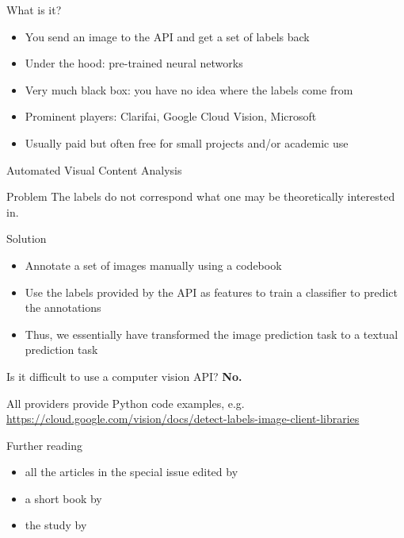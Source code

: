 \begin{frame}{What is it?}
  \begin{itemize}
  \item You send an image to the API and get a set of labels back
  \item Under the hood: pre-trained neural networks
  \item Very much black box: you have no idea where the labels come from
  \item Prominent players: Clarifai, Google Cloud Vision, Microsoft
  \item Usually paid but often free for small projects and/or academic use
  \end{itemize}

\end{frame}


\begin{frame}{Automated Visual Content Analysis  \parencite{Araujo2020b}}
  \begin{alertblock}{Problem}
The labels do not correspond what one may be theoretically interested in.
  \end{alertblock}

  \pause
  
\begin{block}{Solution}
  \begin{itemize}
  \item Annotate a set of images manually using a codebook
  \item Use the labels provided by the API as features to train a classifier to predict the annotations
  \item Thus, we essentially have transformed the image prediction task to a textual prediction task
  \end{itemize}
\end{block}
\end{frame}



\begin{frame}{Is it difficult to use a computer vision API?}
  \textbf{No.}

All providers provide Python code examples, e.g. \url{https://cloud.google.com/vision/docs/detect-labels-image-client-libraries}
  
\end{frame}



\begin{frame}{Further reading}
  \begin{itemize}
  \item all the articles in the special issue edited by \cite{Casas2022}
  \item a short book by \cite{Webbwilliams2020}
  \item the study by \cite{Araujo2020b}
  \end{itemize}
\end{frame}



